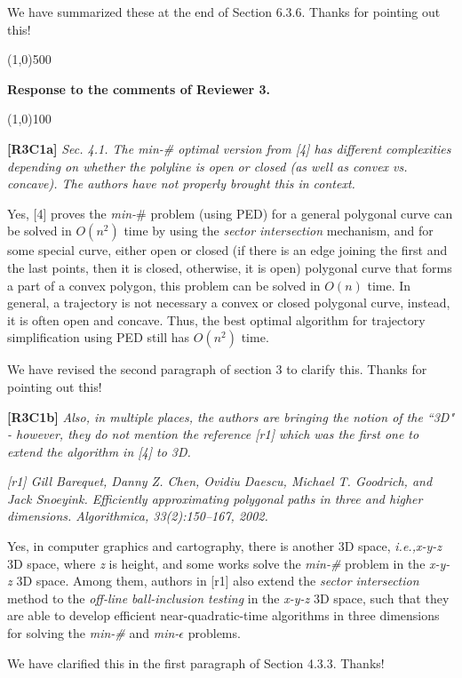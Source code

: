 \documentclass{letter}
\newcommand{\ie}{\emph{i.e.,}\xspace}
\begin{document}
We have summarized these at the end of Section 6.3.6. Thanks for pointing out this!


\line(1,0){500}

\textbf{Response to the comments of Reviewer 3.}

\line(1,0){100}

\textbf{[R3C1a]} \emph{
Sec. 4.1. The min-\# optimal version from [4] has different complexities depending on whether the polyline is open or closed (as well as convex vs. concave). The authors have not properly brought this in context.}

Yes, [4] proves the \emph{min-$\#$} problem (using PED) for a general polygonal curve can be solved in $O(n^2)$ time by using the \textit{sector intersection} mechanism, and for some special curve, either open or closed (if there is an edge joining the first and the last points, then it is closed, otherwise, it is open) polygonal curve that forms  a part of a convex polygon, this problem can be solved in $O(n)$ time. In general, a trajectory is not necessary a convex or closed polygonal curve, instead, it is often open and concave. Thus, the best optimal algorithm for trajectory simplification using PED still has $O(n^2)$ time.

We have revised the second paragraph of section 3 to clarify this. Thanks for pointing out this!

\textbf{[R3C1b]} \emph{Also, in multiple places, the authors are bringing the notion of the ``3D" - however, they do not mention the reference [r1] which was the first one to extend the algorithm in [4] to 3D. }

\emph{[r1] Gill Barequet, Danny Z. Chen, Ovidiu Daescu, Michael T. Goodrich, and Jack Snoeyink. Efficiently approximating polygonal paths in three and higher dimensions. Algorithmica, 33(2):150--167, 2002.}

Yes, in computer graphics and cartography, there is another 3D space, \ie \emph{x-y-z} 3D space, where {\em z} is height, and some works solve the \emph{min-\#} problem in the \emph{x-y-z} 3D space. Among them, authors in [r1] also extend the \textit{sector intersection} method to the \textit{off-line ball-inclusion testing} in the \emph{x-y-z} 3D space, such that they are able to develop efficient near-quadratic-time algorithms in three dimensions for solving the \emph{min-\#} and \emph{min-$\epsilon$} problems. %

We have clarified this in the first paragraph of Section 4.3.3. Thanks!
\end{document}
